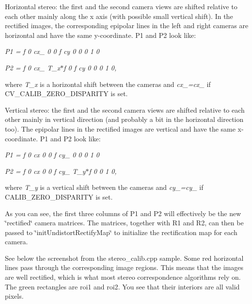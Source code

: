 \begin{DoxyItemize}
\item Horizontal stereo\+: the first and the second camera views are shifted relative to each other mainly along the x axis (with possible small vertical shift). In the rectified images, the corresponding epipolar lines in the left and right cameras are horizontal and have the same y-\/coordinate. P1 and P2 look like\+: 
\end{DoxyItemize}

{\itshape P1 = f 0 cx\+\_ 0 0 f cy 0 0 0 1 0 }

{\itshape P2 = f 0 cx\+\_ T\+\_\+x$\ast$f 0 f cy 0 0 0 1 0,}

where {\itshape T\+\_\+x} is a horizontal shift between the cameras and {\itshape cx\+\_=cx\+\_} if {\ttfamily C\+V\+\_\+\+C\+A\+L\+I\+B\+\_\+\+Z\+E\+R\+O\+\_\+\+D\+I\+S\+P\+A\+R\+I\+TY} is set.


\begin{DoxyItemize}
\item Vertical stereo\+: the first and the second camera views are shifted relative to each other mainly in vertical direction (and probably a bit in the horizontal direction too). The epipolar lines in the rectified images are vertical and have the same x-\/coordinate. P1 and P2 look like\+: 
\end{DoxyItemize}

{\itshape P1 = f 0 cx 0 0 f cy\+\_ 0 0 0 1 0 }

{\itshape P2 = f 0 cx 0 0 f cy\+\_ T\+\_\+y$\ast$f 0 0 1 0,}

where {\itshape T\+\_\+y} is a vertical shift between the cameras and {\itshape cy\+\_=cy\+\_} if {\ttfamily C\+A\+L\+I\+B\+\_\+\+Z\+E\+R\+O\+\_\+\+D\+I\+S\+P\+A\+R\+I\+TY} is set.

As you can see, the first three columns of {\ttfamily P1} and {\ttfamily P2} will effectively be the new \char`\"{}rectified\char`\"{} camera matrices. The matrices, together with {\ttfamily R1} and {\ttfamily R2}, can then be passed to \char`\"{}init\+Undistort\+Rectify\+Map\char`\"{} to initialize the rectification map for each camera.

See below the screenshot from the {\ttfamily stereo\+\_\+calib.\+cpp} sample. Some red horizontal lines pass through the corresponding image regions. This means that the images are well rectified, which is what most stereo correspondence algorithms rely on. The green rectangles are {\ttfamily roi1} and {\ttfamily roi2}. You see that their interiors are all valid pixels.



